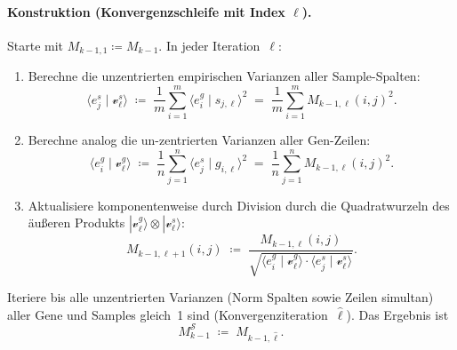 \paragraph{Konstruktion (Konvergenzschleife mit Index $\ell$).}
Starte mit $M_{k-1,1} \coloneqq M_{k-1}$.  In jeder Iteration~$\ell$:
\begin{enumerate}
  \item Berechne die unzentrierten empirischen Varianzen aller
        Sample-Spalten:
        \begin{equation}
            \langle e^s_j \mid \mathcal{v}^s_\ell \rangle
            \;\coloneqq\;
            \frac{1}{m}\sum_{i=1}^{m}
            \langle e^g_i \mid s_{j,\ell} \rangle^2
            \;=\;
            \frac{1}{m}\sum_{i=1}^{m} M_{k-1,\ell}(i,j)^2.
        \end{equation}
  \item Berechne analog die un-zentrierten Varianzen aller Gen-Zeilen:
        \begin{equation}
            \langle e^g_i \mid \mathcal{v}^g_\ell \rangle
            \;\coloneqq\;
            \frac{1}{n}\sum_{j=1}^{n}
            \langle e^s_j \mid g_{i,\ell} \rangle^2
            \;=\;
            \frac{1}{n}\sum_{j=1}^{n} M_{k-1,\ell}(i,j)^2.
        \end{equation}
  \item Aktualisiere komponentenweise durch Division durch die
        Quadratwurzeln des \"{a}u{\ss}eren Produkts
        $|\mathcal{v}^g_\ell\rangle \otimes |\mathcal{v}^s_\ell\rangle$:
        \begin{equation}
            M_{k-1,\ell+1}(i,j)
            \;\coloneqq\;
            \frac{M_{k-1,\ell}(i,j)}
                 {\sqrt{\langle e^g_i \mid \mathcal{v}^g_\ell\rangle
                        \cdot
                        \langle e^s_j \mid \mathcal{v}^s_\ell\rangle}}.
        \end{equation}
\end{enumerate}
Iteriere bis alle unzentrierten Varianzen (Norm Spalten sowie Zeilen simultan) aller Gene und Samples
gleich~1 sind (Konvergenziteration~$\hat\ell$).
Das Ergebnis ist
\begin{equation}
    M^{\mathcal{S}}_{k-1} \;\coloneqq\; M_{k-1,\hat\ell}.
\end{equation}
 
